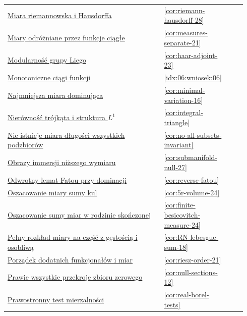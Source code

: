 \documentclass[11pt,a4paper,oneside]{book}
\numberwithin{equation}{chapter}
\theoremstyle{plain}
\theoremstyle{definition}
\theoremstyle{remark}
\begin{document}
\begin{longtable}{@{}p{0.72\linewidth}p{0.135\linewidth}p{0.08\linewidth}@{}}
\hyperref[cor:riemann-hausdorff-28]{Miara riemannowska i Hausdorffa} & \ref*{cor:riemann-hausdorff-28} & \pageref*{cor:riemann-hausdorff-28} \\
\hyperref[cor:measures-separate-21]{Miary odróżniane przez funkcje ciągłe} & \ref*{cor:measures-separate-21} & \pageref*{cor:measures-separate-21} \\
\hyperref[cor:haar-adjoint-23]{Modularność grupy Liego} & \ref*{cor:haar-adjoint-23} & \pageref*{cor:haar-adjoint-23} \\
\hyperref[idx:06:wniosek:06]{Monotoniczne ciągi funkcji} & \ref*{idx:06:wniosek:06} & \pageref*{idx:06:wniosek:06} \\
\hyperref[cor:minimal-variation-16]{Najmniejsza miara dominująca} & \ref*{cor:minimal-variation-16} & \pageref*{cor:minimal-variation-16} \\
\hyperref[cor:integral-triangle]{Nierówność trójkąta i struktura $L^1$} & \ref*{cor:integral-triangle} & \pageref*{cor:integral-triangle} \\
\hyperref[cor:no-all-subsets-invariant]{Nie istnieje miara długości wszystkich podzbiorów} & \ref*{cor:no-all-subsets-invariant} & \pageref*{cor:no-all-subsets-invariant} \\
\hyperref[cor:submanifold-null-27]{Obrazy immersji niższego wymiaru} & \ref*{cor:submanifold-null-27} & \pageref*{cor:submanifold-null-27} \\
\hyperref[cor:reverse-fatou]{Odwrotny lemat Fatou przy dominacji} & \ref*{cor:reverse-fatou} & \pageref*{cor:reverse-fatou} \\
\hyperref[cor:5r-volume-24]{Oszacowanie miary sumy kul} & \ref*{cor:5r-volume-24} & \pageref*{cor:5r-volume-24} \\
\hyperref[cor:finite-besicovitch-measure-24]{Oszacowanie sumy miar w rodzinie skończonej} & \ref*{cor:finite-besicovitch-measure-24} & \pageref*{cor:finite-besicovitch-measure-24} \\
\hyperref[cor:RN-lebesgue-sum-18]{Pełny rozkład miary na część z gęstością i osobliwą} & \ref*{cor:RN-lebesgue-sum-18} & \pageref*{cor:RN-lebesgue-sum-18} \\
\hyperref[cor:riesz-order-21]{Porządek dodatnich funkcjonałów i miar} & \ref*{cor:riesz-order-21} & \pageref*{cor:riesz-order-21} \\
\hyperref[cor:null-sections-12]{Prawie wszystkie przekroje zbioru zerowego} & \ref*{cor:null-sections-12} & \pageref*{cor:null-sections-12} \\
\hyperref[cor:real-borel-tests]{Prawostronny test mierzalności} & \ref*{cor:real-borel-tests} & \pageref*{cor:real-borel-tests} \\

\end{longtable}
\end{document}
